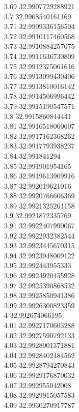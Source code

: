 {3.69	32.9907729288921\\
3.7	32.9908540161169\\
3.71	32.9909336156504\\
3.72	32.9910117460568\\
3.73	32.9910884257675\\
3.74	32.9911636730809\\
3.75	32.9912375061616\\
3.76	32.9913099430406\\
3.77	32.9913810016142\\
3.78	32.9914506996442\\
3.79	32.9915190547571\\
3.8	32.9915860844441\\
3.81	32.9916518060607\\
3.82	32.9917162368262\\
3.83	32.9917793938237\\
3.84	32.991841294\\
3.85	32.991901954165\\
3.86	32.9919613909916\\
3.87	32.992019621016\\
3.88	32.9920766606369\\
3.89	32.9921325261158\\
3.9	32.9921872335769\\
3.91	32.9922407990067\\
3.92	32.9922932382544\\
3.93	32.9923445670315\\
3.94	32.9923948009122\\
3.95	32.992443955333\\
3.96	32.9924920455928\\
3.97	32.9925390868532\\
3.98	32.9925850941386\\
3.99	32.9926300823359\\
4	32.992674066195\\
4.01	32.9927170603288\\
4.02	32.9927590792133\\
4.03	32.9928001371881\\
4.04	32.9928402484562\\
4.05	32.9928794270843\\
4.06	32.9929176870032\\
4.07	32.992955042008\\
4.08	32.9929915057583\\
4.09	32.9930270917787\\
}
